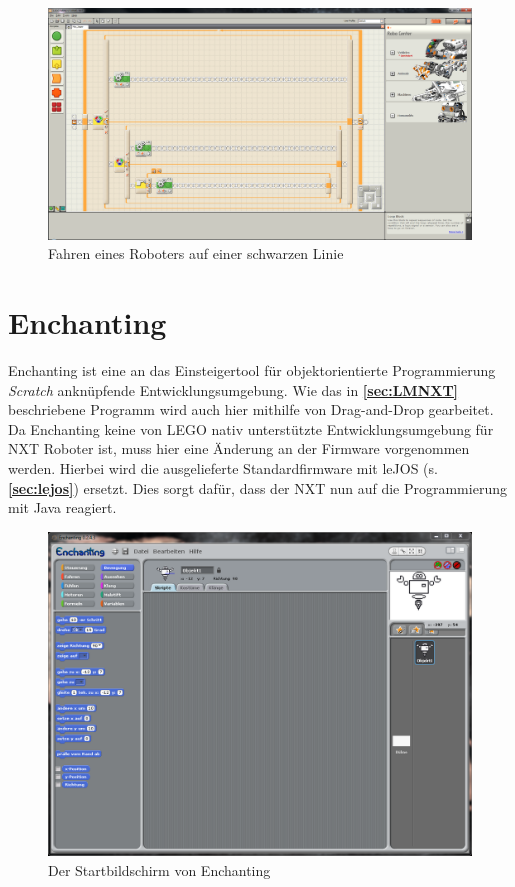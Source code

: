 \documentclass[paper=a4, DIV=calc, BCOR=12mm, twoside=on, onecolumn=on, open = right, titlepage =on, parskip =half-, headsepline = on, footsepline = off, chapterprefix = off, appendixprefix = on, fontsize = 12pt, numbers = noenddot, abstract = on]{scrbook}
\begin{document}
\begin{figure}[htb]
\centering
\includegraphics[width=\textwidth]{images/Beispielprogramm_NXT.png} 
\caption{Fahren eines Roboters auf einer schwarzen Linie}
\label{fig:Bsp NXT}
\end{figure}


\section{Enchanting}
\label{sec:enchanting}
Enchanting ist eine an das Einsteigertool für objektorientierte Programmierung \emph{Scratch} anknüpfende Entwicklungsumgebung. Wie das in \textbf{\ref{sec:LMNXT}} beschriebene Programm wird auch hier mithilfe von Drag-and-Drop gearbeitet. Da Enchanting keine von LEGO nativ unterstützte Entwicklungsumgebung für NXT Roboter ist, muss hier eine Änderung an der Firmware vorgenommen werden. Hierbei wird die ausgelieferte Standardfirmware mit leJOS (s. \textbf{\ref{sec:lejos}}) ersetzt. Dies sorgt dafür, dass der NXT nun auf die Programmierung mit Java reagiert.


\begin{figure}[htb]
\centering
\includegraphics[width=\textwidth]{images/Enchanting_Start.png} 
\caption{Der Startbildschirm von Enchanting}
\label{fig:Enchanting Start}
\end{figure}
\end{document}
